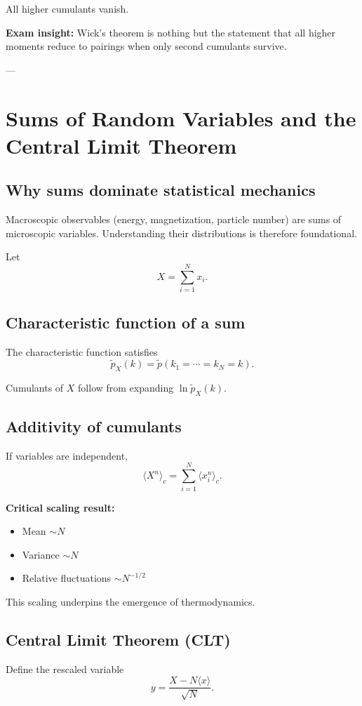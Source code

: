 \documentclass[9pt,twocoloumn]{article}
\begin{document}
All higher cumulants vanish.

\textbf{Exam insight:} Wick’s theorem is nothing but the statement that all higher moments reduce to pairings when only second cumulants survive.

---

\section{Sums of Random Variables and the Central Limit Theorem}

\subsection*{Why sums dominate statistical mechanics}
Macroscopic observables (energy, magnetization, particle number) are sums of microscopic variables. Understanding their distributions is therefore foundational.

Let
\[
X = \sum_{i=1}^N x_i.
\]

\subsection*{Characteristic function of a sum}
The characteristic function satisfies
\[
\tilde p_X(k) = \tilde p(k_1=\cdots=k_N=k).
\]

Cumulants of $X$ follow from expanding $\ln \tilde p_X(k)$.

\subsection*{Additivity of cumulants}
If variables are independent,
\[
\langle X^n \rangle_c = \sum_{i=1}^N \langle x_i^n \rangle_c.
\]

\textbf{Critical scaling result:}
\begin{itemize}
\item Mean $\sim N$
\item Variance $\sim N$
\item Relative fluctuations $\sim N^{-1/2}$
\end{itemize}

This scaling underpins the emergence of thermodynamics.

\subsection*{Central Limit Theorem (CLT)}
Define the rescaled variable
\[
y = \frac{X - N\langle x\rangle}{\sqrt{N}}.
\]
\end{document}
